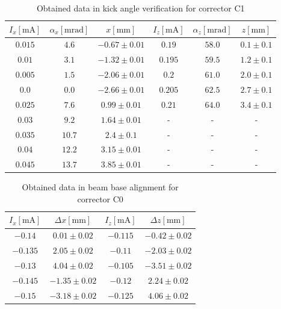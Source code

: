 \documentclass[12pt]{article}
\begin{document}
\begin{table}[H]
    \centering
    \begin{tabular}{c|c|c|c|c|c}
        \hline
        \hline
        $I_x \mathrm{[mA]}$ & $\alpha_x \mathrm{[mrad]}$ & $x \mathrm{[mm]}$ &$I_z \mathrm{[mA]}$ & $\alpha_z \mathrm{[mrad]}$ & $z \mathrm{[mm]}$ \\
        \hline

        $ 0.015 $ & $ 4.6 $ & $ -0.67 \pm 0.01$ & $ 0.19 $ & $ 58.0 $ & $ 0.1 \pm 0.1$ \\ 
        $ 0.01 $ & $ 3.1 $ & $ -1.32 \pm 0.01$ & $ 0.195 $ & $ 59.5 $ & $ 1.2 \pm 0.1$ \\ 
        $ 0.005 $ & $ 1.5 $ & $ -2.06 \pm 0.01$ & $ 0.2 $ & $ 61.0 $ & $ 2.0 \pm 0.1$ \\ 
        $ 0.0 $ & $ 0.0 $ & $ -2.66 \pm 0.01$ & $ 0.205 $ & $ 62.5 $ & $ 2.7 \pm 0.1$ \\ 
        $ 0.025 $ & $ 7.6 $ & $ 0.99 \pm 0.01$ & $ 0.21 $ & $ 64.0 $ & $ 3.4 \pm 0.1$ \\ 
        $ 0.03 $ & $ 9.2 $ & $ 1.64 \pm 0.01$ & - & - & - \\ 
        $ 0.035 $ & $ 10.7 $ & $ 2.4 \pm 0.1$  & - & - & - \\ 
        $ 0.04 $ & $ 12.2 $ & $ 3.15 \pm 0.01$ & - & - & - \\ 
        $ 0.045 $ & $ 13.7 $ & $ 3.85 \pm 0.01$ & - & - & - \\
        \hline
    \end{tabular}
    \caption{Obtained data in kick angle verification for corrector C1}
    \label{C1row}
\end{table}

\begin{table}[H]
    \centering
    \begin{tabular}{c|c|c|c}
        \hline
        \hline
        $I_x \mathrm{[mA]}$ &   $\Delta x \mathrm{[mm]}$ &$I_z \mathrm{[mA]}$ & $\Delta z \mathrm{[mm]}$ \\
        \hline
        $ -0.14 $ & $ 0.01 \pm 0.02 $ & $ -0.115 $ & $ -0.42 \pm 0.02 $ \\ 
        $ -0.135 $ & $ 2.05 \pm 0.02 $ & $ -0.11 $ & $ -2.03 \pm 0.02 $ \\ 
        $ -0.13 $ & $ 4.04 \pm 0.02 $ & $ -0.105 $ & $ -3.51 \pm 0.02 $ \\ 
        $ -0.145 $ & $ -1.35 \pm 0.02 $ & $ -0.12 $ & $ 2.24 \pm 0.02 $ \\ 
        $ -0.15 $ & $ -3.18 \pm 0.02 $ & $ -0.125 $ & $ 4.06 \pm 0.02 $ \\ 
        \hline
    \end{tabular}
    \caption{Obtained data in beam base alignment for corrector C0}
    \label{BC0row}
\end{table}
\end{document}
